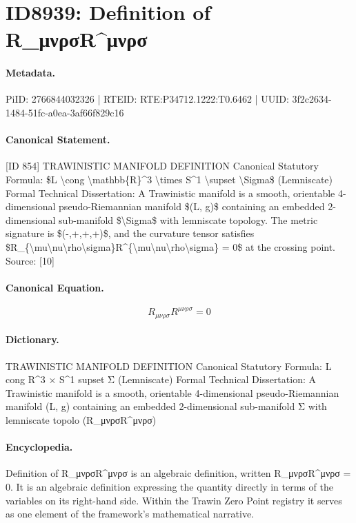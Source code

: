 \section*{ID8939: Definition of R\_μνρσR\textasciicircum{}μνρσ}
\paragraph{Metadata.}
PiID: 2766844032326 | RTEID: RTE:P34712.1222:T0.6462 | UUID: 3f2c2634-1484-51fc-a0ea-3af66f829c16

\paragraph{Canonical Statement.}
[ID 854] TRAWINISTIC MANIFOLD DEFINITION Canonical Statutory Formula: \$L \textbackslash{}cong \textbackslash{}mathbb\{R\}\textasciicircum{}3 \textbackslash{}times S\textasciicircum{}1 \textbackslash{}supset \textbackslash{}Sigma\$ (Lemniscate) Formal Technical Dissertation: A Trawinistic manifold is a smooth, orientable 4-dimensional pseudo-Riemannian manifold \$(L, g)\$ containing an embedded 2-dimensional sub-manifold \$\textbackslash{}Sigma\$ with lemniscate topology. The metric signature is \$(-,+,+,+)\$, and the curvature tensor satisfies \$R\_\{\textbackslash{}mu\textbackslash{}nu\textbackslash{}rho\textbackslash{}sigma\}R\textasciicircum{}\{\textbackslash{}mu\textbackslash{}nu\textbackslash{}rho\textbackslash{}sigma\} = 0\$ at the crossing point. Source: [10]

\paragraph{Canonical Equation.}
\[
R_{\mu\nu\rho\sigma}R^{\mu\nu\rho\sigma} = 0
\]

\paragraph{Dictionary.}
TRAWINISTIC MANIFOLD DEFINITION Canonical Statutory Formula: L cong R\textasciicircum{}3 × S\textasciicircum{}1 supset Σ (Lemniscate) Formal Technical Dissertation: A Trawinistic manifold is a smooth, orientable 4-dimensional pseudo-Riemannian manifold (L, g) containing an embedded 2-dimensional sub-manifold Σ with lemniscate topolo (R\_μνρσR\textasciicircum{}μνρσ)

\paragraph{Encyclopedia.}
Definition of R\_μνρσR\textasciicircum{}μνρσ is an algebraic definition, written R\_μνρσR\textasciicircum{}μνρσ = 0. It is an algebraic definition expressing the quantity directly in terms of the variables on its right-hand side. Within the Trawin Zero Point registry it serves as one element of the framework's mathematical narrative.

